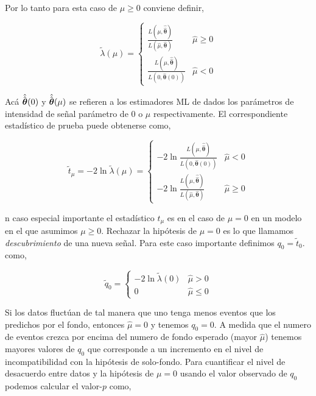 Por lo tanto para esta caso de $\mu \geq 0$ conviene definir,

\begin{equation}
  \tilde{\lambda}(\mu) =
  \begin{cases}
    \frac{L(\mu, \hat{\hat{\bm{\theta}}})}{L(\hat{\mu}, \hat{\bm{\theta}})} & \hat{\mu} \geq 0 \\
    \frac{L(\mu, \hat{\hat{\bm{\theta}}})}{L(0, \hat{\bm{\theta}}(0))} & \hat{\mu} < 0
  \end{cases}
\end{equation}

Acá $\hat{\hat{\bm{\theta}}}(0)$ y $\hat{\hat{\bm{\theta}}}(\mu)$ se refieren a los estimadores ML de {\btheta} dados
los parámetros de intensidad de señal parámetro de 0 o $\mu$ respectivamente. El correspondiente
estadístico de prueba puede obtenerse como,

\begin{equation}
  \tilde{t}_\mu = -2 \ln \tilde{\lambda}(\mu) =
  \begin{cases}
    -2 \ln \frac{L(\mu, \hat{\hat{\bm{\theta}}})}{L(0, \hat{\bm{\theta}}(0))} & \hat{\mu} < 0 \\
    -2 \ln \frac{L(\mu, \hat{\hat{\bm{\theta}}})}{L(\hat{\mu}, \hat{\bm{\theta}})} & \hat{\mu} \geq 0
  \end{cases}
\end{equation}


n caso especial importante el estadístico $t_\mu$ es en el caso de $\mu=0$ en un modelo en el que
asumimos $\mu \geq 0$. Rechazar la hipótesis de $\mu=0$ es lo que llamamos \emph{descubrimiento} de
una nueva señal. Para este caso importante definimos $q_0=\tilde{t}_0$. como,

\begin{equation}
  \tilde{q}_0 =
  \begin{cases}
    -2 \ln \tilde{\lambda}(0) & \hat{\mu} > 0 \\
    0 & \hat{\mu} \leq 0
  \end{cases}
\end{equation}

Si los datos fluctúan de tal manera que uno tenga menos eventos que los predichos por
el fondo, entonces $\hat{\mu} = 0$ y tenemos $q_0=0$. A medida que el numero de eventos
crezca por encima del numero de fondo esperado (mayor $\hat{\mu}$) tenemos mayores valores
de $q_0$ que corresponde a un incremento en el nivel de incompatibilidad con la hipótesis
de solo-fondo. Para cuantificar el nivel de desacuerdo entre datos y la hipótesis de
$\mu=0$ usando el valor observado de $q_0$ podemos calcular el valor-$p$ como,

